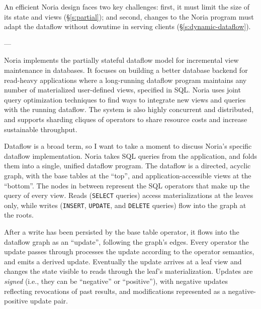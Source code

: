 %
%

%
An efficient Noria design faces two key challenges: first, it must limit the
size of its state and views (\S\ref{s:partial}); and second, changes to the
Noria program must adapt the dataflow without downtime in serving clients
(\S\ref{s:dynamic-dataflow}).
%

---

Noria implements the partially stateful dataflow model for incremental view
maintenance in databases. It focuses on building a better database backend for
read-heavy applications where a long-running dataflow program maintains any
number of materialized user-defined views, specified in SQL. Noria uses joint
query optimization techniques to find ways to integrate new views and queries
with the running dataflow. The system is also highly concurrent and distributed,
and supports sharding cliques of operators to share resource costs and increase
sustainable throughput.

Dataflow is a broad term, so I want to take a moment to discuss Noria's specific
dataflow implementation. Noria takes SQL queries from the application, and folds
them into a single, unified dataflow program. The dataflow is a directed,
acyclic graph, with the base tables at the ``top'', and application-accessible
views at the ``bottom''. The nodes in between represent the SQL operators that
make up the query of every view. Reads (\texttt{SELECT} queries) access
materializations at the leaves only, while writes (\texttt{INSERT},
\texttt{UPDATE}, and \texttt{DELETE} queries) flow into the graph at the roots.

After a write has been persisted by the base table operator, it flows into the
dataflow graph as an ``update'', following the graph's edges. Every operator the
update passes through processes the update according to the operator semantics,
and emits a derived update. Eventually the update arrives at a leaf view and
changes the state visible to reads through the leaf's materialization. Updates
are \emph{signed} (i.e., they can be ``negative'' or ``positive''), with
negative updates reflecting revocations of past results, and modifications
represented as a negative-positive update pair.

